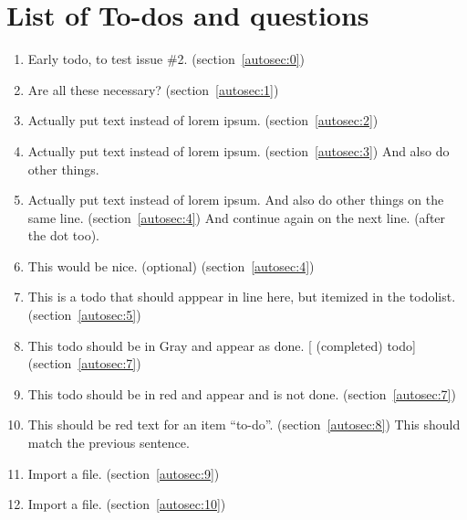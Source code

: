 \section{List of To-dos and questions}
    \begin{enumerate}[noitemsep]
        \item {\color{red}Early todo, to test issue \#2.} (section~\ref{autosec:0})
        \item {\color{ForestGreen}Are all these necessary?} (section~\ref{autosec:1})
        \item {\color{red}Actually put text instead of lorem ipsum.} (section~\ref{autosec:2})
        \item {\color{red}Actually put text instead of lorem ipsum.} (section~\ref{autosec:3})
{\color{red}And also do other things.}
        \item {\color{red}Actually put text instead of lorem ipsum. And also do other things on the same line.} (section~\ref{autosec:4})
{\color{red}And continue again on the next line. (after the dot too).}
        \item {\color{Orange}This would be nice. (optional)} (section~\ref{autosec:4})
        \item {\color{red}This is a todo that should apppear in line here, but itemized in the todolist.} (section~\ref{autosec:5})
        \item {\color{Gray}This todo should be in Gray and appear as done. [ (completed) todo]} (section~\ref{autosec:7})
        \item {\color{red}This todo should be in red and appear and is not done.} (section~\ref{autosec:7})
        \item {\color{red}This should be red text for an item ``to-do''.} (section~\ref{autosec:8})
{\color{red}This should match the previous sentence.}
        \item {\color{red}Import a file.} (section~\ref{autosec:9})
        \item {\color{red}Import a file.} (section~\ref{autosec:10})
    \end{enumerate}

